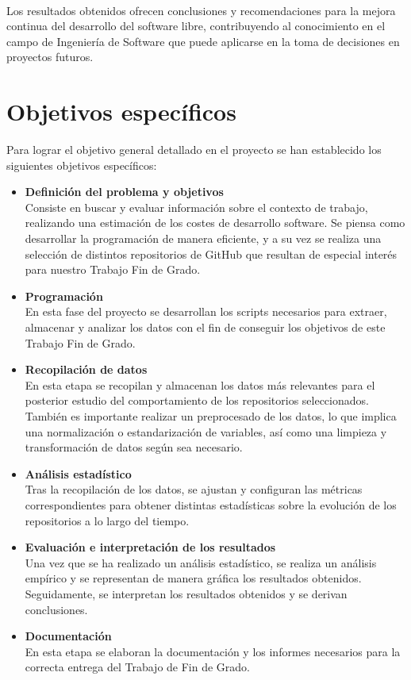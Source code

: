 \documentclass[a4paper, 12pt]{book}
\begin{document}
\\Los resultados obtenidos ofrecen conclusiones y recomendaciones para la mejora continua del desarrollo del software libre,
contribuyendo al conocimiento en el campo de Ingeniería de Software que puede aplicarse en la toma de decisiones en proyectos futuros.

\section{Objetivos específicos}
\label{sec:objetivos-especificos}

Para lograr el objetivo general detallado en el proyecto se han establecido los siguientes objetivos específicos:
\begin{itemize}
  
  \item \textbf{Definición del problema y objetivos}
  \\Consiste en buscar y evaluar información sobre el contexto de trabajo, realizando una estimación de los
  costes de desarrollo software. Se piensa como desarrollar la programación de manera eficiente, y a su vez se realiza una selección de distintos
  repositorios de GitHub que resultan de especial interés para nuestro Trabajo Fin de Grado.

  \item \textbf{Programación}
  \\En esta fase del proyecto se desarrollan los scripts necesarios para extraer, almacenar y analizar los datos con
  el fin de conseguir los objetivos de este Trabajo Fin de Grado.
  
  \item \textbf{Recopilación de datos}
  \\En esta etapa se recopilan y almacenan los datos más relevantes para el posterior estudio del comportamiento
  de los repositorios seleccionados. También es importante realizar un preprocesado de los datos, lo que implica una
  normalización o estandarización de variables, así como una limpieza y transformación de datos según sea necesario.
  
  \item \textbf{Análisis estadístico}
  \\Tras la recopilación de los datos, se ajustan y configuran las métricas correspondientes para obtener
  distintas estadísticas sobre la evolución de los repositorios a lo largo del tiempo.

  \item \textbf{Evaluación e interpretación de los resultados}
  \\Una vez que se ha realizado un análisis estadístico, se realiza un análisis empírico y se representan 
  de manera gráfica los resultados obtenidos. Seguidamente, se interpretan los resultados obtenidos y se
  derivan conclusiones.
 
  \item \textbf{Documentación}
  \\En esta etapa se elaboran la documentación y los informes necesarios para la correcta entrega del Trabajo de Fin de Grado.

\end{itemize}
\end{document}
